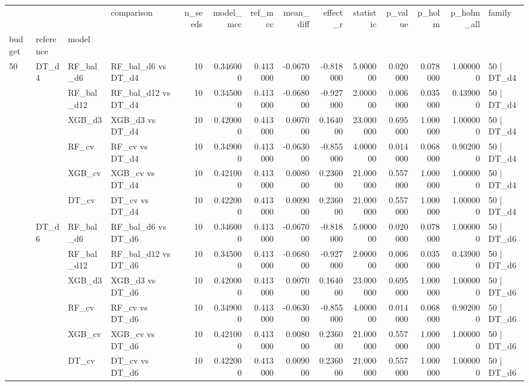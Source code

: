 \begin{tabular}{llllrrrrrrrrrl}
\toprule
 &  &  & comparison & n_seeds & model_mcc & ref_mcc & mean_diff & effect_r & statistic & p_value & p_holm & p_holm_all & family \\
budget & reference & model &  &  &  &  &  &  &  &  &  &  &  \\
\midrule
\multirow[t]{18}{*}{50} & \multirow[t]{6}{*}{DT_d4} & RF_bal_d6 & RF_bal_d6 vs DT_d4 & 10 & 0.346000 & 0.413000 & -0.067000 & -0.818000 & 5.000000 & 0.020000 & 0.078000 & 1.000000 & 50 | DT_d4 \\
 &  & RF_bal_d12 & RF_bal_d12 vs DT_d4 & 10 & 0.345000 & 0.413000 & -0.068000 & -0.927000 & 2.000000 & 0.006000 & 0.035000 & 0.439000 & 50 | DT_d4 \\
 &  & XGB_d3 & XGB_d3 vs DT_d4 & 10 & 0.420000 & 0.413000 & 0.007000 & 0.164000 & 23.000000 & 0.695000 & 1.000000 & 1.000000 & 50 | DT_d4 \\
 &  & RF_cv & RF_cv vs DT_d4 & 10 & 0.349000 & 0.413000 & -0.063000 & -0.855000 & 4.000000 & 0.014000 & 0.068000 & 0.902000 & 50 | DT_d4 \\
 &  & XGB_cv & XGB_cv vs DT_d4 & 10 & 0.421000 & 0.413000 & 0.008000 & 0.236000 & 21.000000 & 0.557000 & 1.000000 & 1.000000 & 50 | DT_d4 \\
 &  & DT_cv & DT_cv vs DT_d4 & 10 & 0.422000 & 0.413000 & 0.009000 & 0.236000 & 21.000000 & 0.557000 & 1.000000 & 1.000000 & 50 | DT_d4 \\
\cline{2-14}
 & \multirow[t]{6}{*}{DT_d6} & RF_bal_d6 & RF_bal_d6 vs DT_d6 & 10 & 0.346000 & 0.413000 & -0.067000 & -0.818000 & 5.000000 & 0.020000 & 0.078000 & 1.000000 & 50 | DT_d6 \\
 &  & RF_bal_d12 & RF_bal_d12 vs DT_d6 & 10 & 0.345000 & 0.413000 & -0.068000 & -0.927000 & 2.000000 & 0.006000 & 0.035000 & 0.439000 & 50 | DT_d6 \\
 &  & XGB_d3 & XGB_d3 vs DT_d6 & 10 & 0.420000 & 0.413000 & 0.007000 & 0.164000 & 23.000000 & 0.695000 & 1.000000 & 1.000000 & 50 | DT_d6 \\
 &  & RF_cv & RF_cv vs DT_d6 & 10 & 0.349000 & 0.413000 & -0.063000 & -0.855000 & 4.000000 & 0.014000 & 0.068000 & 0.902000 & 50 | DT_d6 \\
 &  & XGB_cv & XGB_cv vs DT_d6 & 10 & 0.421000 & 0.413000 & 0.008000 & 0.236000 & 21.000000 & 0.557000 & 1.000000 & 1.000000 & 50 | DT_d6 \\
 &  & DT_cv & DT_cv vs DT_d6 & 10 & 0.422000 & 0.413000 & 0.009000 & 0.236000 & 21.000000 & 0.557000 & 1.000000 & 1.000000 & 50 | DT_d6 \\

\end{tabular}
